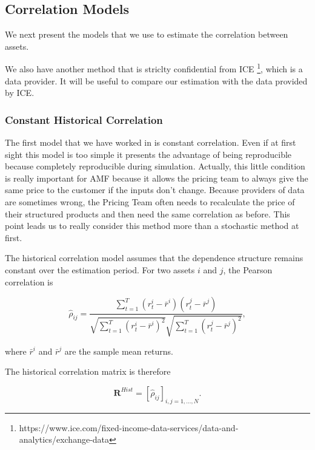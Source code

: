 \documentclass{article}
\begin{document}
\subsection{Correlation Models}

We next present the models that we use to estimate the correlation between assets.

We also have another method that is striclty confidential from ICE \footnote{https://www.ice.com/fixed-income-data-services/data-and-analytics/exchange-data}, which is a data provider. It will be useful to compare our estimation with the data provided by ICE.

\subsubsection{Constant Historical Correlation}

The first model that we have worked in is constant correlation. Even if at first sight this model is too simple it presents the advantage of being reproducible because completely reproducible during simulation. Actually, this little condition is really important for AMF because it allows the pricing team to always give the same price to the customer if the inputs don't change. Because providers of data are sometimes wrong, the Pricing Team often needs to recalculate the price of their structured products and then need the same correlation as before. This point leads us to really consider this method more than a stochastic method at first. 

The historical correlation model assumes that the dependence structure remains constant over the estimation period. For two assets $i$ and $j$, the Pearson correlation is

\begin{equation}
\hat{\rho}_{ij}
=
\frac{
\sum_{t=1}^{T}
(r_t^i-\bar r^i)(r_t^j-\bar r^j)
}{
\sqrt{
\sum_{t=1}^{T}(r_t^i-\bar r^i)^2
}
\sqrt{
\sum_{t=1}^{T}(r_t^j-\bar r^j)^2
}
},
\end{equation}

where $\bar r^i$ and $\bar r^j$ are the sample mean returns.

The historical correlation matrix is therefore

\begin{equation}
\mathbf{R}^{Hist}
=
\left[
\hat{\rho}_{ij}
\right]_{i,j=1,\ldots,N}.
\end{equation}
\end{document}
